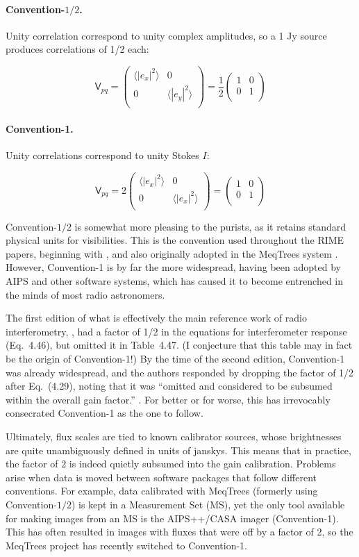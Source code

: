 \documentclass{aa}
\newcommand{\matrixtt}[4]{\left( \begin{array}{cc}#1&#2\\#3&#4\\\end{array} \right)}
\newcommand{\coh}[2]{\mathsf{{#1}}_{{#2}}}
\begin{document}
\paragraph{Convention-$\scriptstyle 1/2$.} Unity correlation correspond to unity complex amplitudes, so a 1 Jy source produces correlations of 1/2 each: 

\[
\coh{V}{pq} = \matrixtt{\langle |e_x|^2\rangle }{0}{0}{\langle |e_y|^2\rangle } = \frac{1}{2}\matrixtt{1}{0}{0}{1}
\]

\paragraph{Convention-1.} Unity correlations correspond to unity Stokes $I$:

\[
\coh{V}{pq} = 2\matrixtt{\langle |e_x|^2\rangle }{0}{0}{\langle |e_x|^2\rangle } = \matrixtt{1}{0}{0}{1}
\]

Convention-$\scriptstyle 1/2$ is somewhat more pleasing to the purists, as it retains standard physical units for visibilities. This is the convention used throughout the RIME papers, beginning with \citet{ME1}, and also originally adopted in the MeqTrees system \citep{meqtrees}. However, Convention-1 is by far the more widespread, having been adopted by AIPS and other software systems, which has caused it to become entrenched in the minds of most radio astronomers.

The first edition of what is effectively the main reference work of radio interferometry, \citet*{tms1}, had a factor of 1/2 in the equations for interferometer response (Eq.~4.46), but omitted it in Table~4.47. (I conjecture that this table may in fact be the origin of Convention-1!) By the time of the second edition, Convention-1 was already widespread, and the authors responded by dropping the factor of 1/2 after Eq.~(4.29), noting that it was ``omitted and considered to be subsumed within the overall gain factor.'' \citep[see p. 102]{tms}. For better or for worse, this has irrevocably consecrated Convention-1 as the one to follow.

Ultimately, flux scales are tied to known calibrator sources, whose brightnesses are quite unambiguously defined in units of janskys. This means that in practice, the factor of 2 is indeed quietly subsumed into the gain calibration. Problems arise when data is moved between software packages that follow different conventions. For example, data calibrated with MeqTrees (formerly using  Convention-$\scriptstyle 1/2$) is kept in a Measurement Set (MS), yet the only tool available for making images from an MS is the AIPS++/CASA imager (Convention-1). This has often resulted in images with fluxes that were off by a factor of 2, so the MeqTrees project has recently switched to Convention-1.
\end{document}
